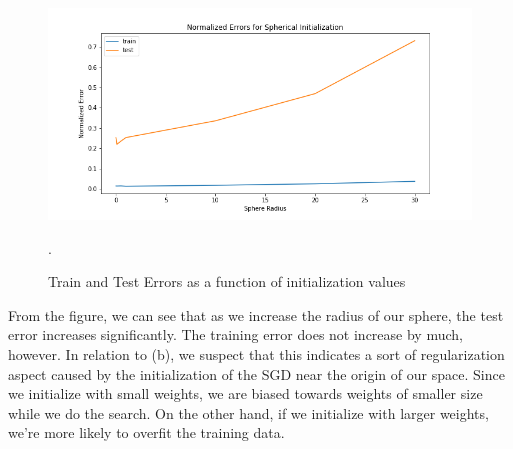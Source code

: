 \documentclass[12pt]{article}
\begin{document}
\begin{enumerate}[label=(\alph*)]
      \begin{figure}
        \centering
        \includegraphics[scale=0.4]{figures/spherical_initialization.png}
        \caption{Train and Test Errors as a function of initialization values}.
        \label{fig:spherical}
      \end{figure}

    From the figure, we can see that as we increase the radius of our sphere, the test error increases significantly. The training error does not increase by much, however. In relation to (b), we suspect that this indicates a sort of regularization aspect caused by the initialization of the SGD near the origin of our space. Since we initialize with small weights, we are biased towards weights of smaller size while we do the search. On the other hand, if we initialize with larger weights, we're more likely to overfit the training data.
\end{enumerate}


\newpage
\end{document}
